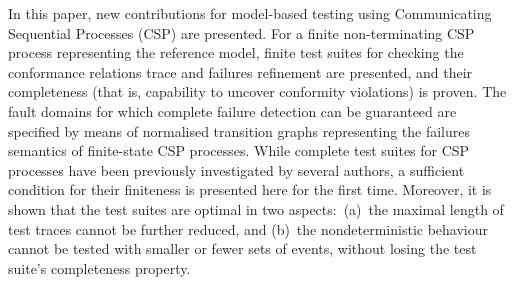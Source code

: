 In this paper, new contributions for model-based testing using Communicating
Sequential Processes (CSP) are presented. For a finite non-terminating CSP
process representing the reference model, finite test suites for checking the
conformance relations trace and failures refinement are presented, and their
completeness (that is, capability to uncover conformity violations) is
proven. The fault domains for which complete failure detection can be
guaranteed are specified by means of normalised transition graphs
representing the failures semantics of finite-state CSP processes. While
complete test suites for CSP processes have been previously investigated by
several authors, a sufficient condition for their finiteness is presented
here for the first time. Moreover, it is shown that the test suites are
optimal in two aspects:~(a)~the maximal length of test traces cannot be
further reduced, and (b)~the nondeterministic behaviour cannot be tested with
smaller or fewer sets of events, without losing the test suite's completeness
property.
